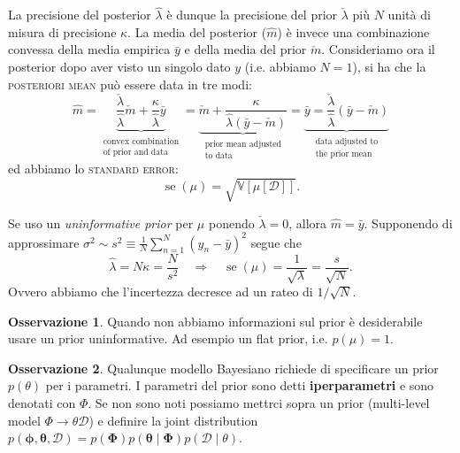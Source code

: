 \documentclass[10pt]{article}
\newcommand{\ve}[1]{\bm{#1}}
\newcommand{\im}[1]{\textsc{#1}}
\newcommand{\cond}{\mid}
\theoremstyle{definition}
\newtheorem{observation}{Osservazione}[subsection]
\begin{document}
    La precisione del posterior \(\hat{\lambda}\) è dunque la precisione del prior \(\check{\lambda}\)
    più \(N\) unità di misura di precisione \(\kappa\). La media del posterior (\(\hat{m}\)) è invece
    una combinazione convessa della media empirica \(\bar{y}\) e della media del prior \(\check{m}\).
    Consideriamo ora il posterior dopo aver visto un singolo dato \(y\) (i.e. abbiamo \(N = 1\)),
    si ha che la \im{posteriori mean} può essere data in tre modi:
    \begin{equation}
        \hat{m} = \underbrace{\frac{\check{\lambda}}{\hat{\lambda}}\check{m} + \frac{\kappa}{\hat{\lambda}}\bar{y}}_{\substack{\text{convex combination}\\ \text{of prior and data}}}
        = \underbrace{\check{m} + \frac{\kappa}{\hat{\lambda} \left( \bar{y} - \check{m} \right)}}_{\substack{\text{prior mean adjusted}\\ \text{to data}}}
        = \underbrace{\bar{y} = \frac{\check{\lambda}}{\hat{\lambda}}\left( \bar{y} - \check{m} \right)}_{\substack{\text{data adjusted to} \\ \text{the prior mean}}}
    \end{equation}
    ed abbiamo lo \im{standard error}:
    \begin{equation}
        \operatorname{se} \left( \mu \right) = \sqrt{\mathbb{V}\left[ \mu \left[ \mathcal{D} \right] \right]}.
    \end{equation}

    Se uso un \textit{uninformative prior} per \(\mu\) ponendo \(\check{\lambda} = 0\), allora \(\hat{m} = \bar{y}\).
    Supponendo di approssimare \(\sigma^2 \sim s^2 \equiv \frac{1}{N}\sum_{n=1}^N \left( y_n - \bar{y} \right)^2\) segue che
    \begin{equation}
        \hat{\lambda} = N\kappa = \frac{N}{s^2} \quad \Longrightarrow \quad \operatorname{se} \left( \mu \right) = \frac{1}{\sqrt{\lambda}} = \frac{s}{\sqrt{N}}.
    \end{equation}
    Ovvero abbiamo che l'incertezza decresce ad un rateo di \(1/\sqrt{N}\).

    \begin{observation}
        Quando non abbiamo informazioni sul prior è desiderabile usare un prior uninformative.
        Ad esempio un flat prior, i.e. \(p \left( \mu \right) = 1 \).
    \end{observation}

    \begin{observation}
        Qualunque modello Bayesiano richiede di specificare un prior \(p \left( \theta \right)\) per i parametri.
        I parametri del prior sono detti \textbf{iperparametri} e sono denotati con \(\Phi\). Se non
        sono noti possiamo mettrci sopra un prior (multi-level model \(\Phi\rightarrow\theta\mathcal{D}\)) e
        definire la joint distribution \(p \left( \ve{\phi}, \ve{\theta}, \mathcal{D} \right) = p \left( \ve{\Phi} \right) p \left( \ve{\theta} \cond \ve{\Phi}\right) p \left( \mathcal{D} \cond \theta \right)\).
    \end{observation}
\end{document}
